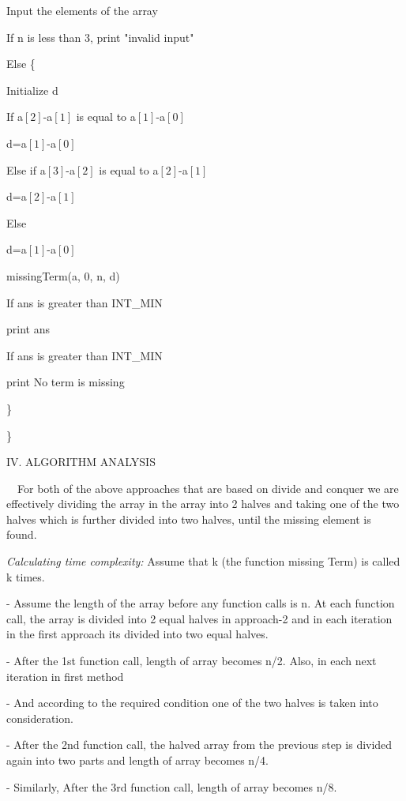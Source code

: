 \documentclass[12pt,a4paper]{article}
\begin{document}
\begin{multicols}{2}
\quad Input the elements of the array 

\quad If n is less than 3, print "invalid input"

\quad Else \{

\quad Initialize d

\quad If a$[2]$-a$[1]$ is equal to a$[1]$-a$[0]$

\quad \quad d=a$[1]$-a$[0]$

\quad Else if a$[3]$-a$[2]$ is equal to a$[2]$-a$[1]$

\quad \quad d=a$[2]$-a$[1]$

\quad Else 

\quad \quad d=a$[1]$-a$[0]$

\quad missingTerm(a, 0, n, d)

\quad If ans is greater than INT\_MIN

\quad \quad print ans

\quad If ans is greater than INT\_MIN

\quad \quad print No term is missing

\}



\} 

\begin{center}IV. ALGORITHM ANALYSIS\end{center}


\ \ For both of the above approaches that are based on divide and conquer we are effectively dividing the array in the array into 2 halves and taking one of the two halves which is further divided into two halves, until the missing element is found.
 

\textit{ Calculating time complexity: }Assume that k (the function missing Term) is called k times. 

-  Assume the length of the array before any function calls is n. At each function call, the array is divided into 2 equal halves in approach-2 and in each iteration in the first approach its divided into two equal halves. 

- After the 1st function call, length of array becomes n/2. Also, in each next iteration in first method

- And according to the required condition one of the two halves is taken into consideration.

-  After the 2nd function call, the halved array from the previous step is divided again into two parts and length of array becomes n/4.

-  Similarly, After the 3rd function call, length of array becomes n/8.


\end{multicols}
\end{document}

